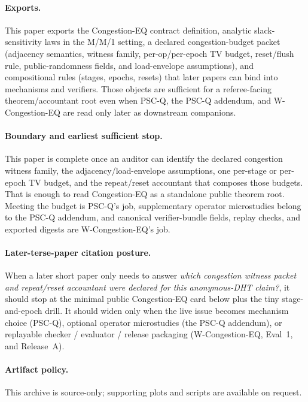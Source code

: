 \documentclass[11pt]{article}
\theoremstyle{definition}
\theoremstyle{remark}
\begin{document}
\paragraph{Exports.}
This paper exports the Congestion-EQ contract definition, analytic slack-sensitivity laws in the M/M/1 setting, a declared congestion-budget packet (adjacency semantics, witness family, per-op/per-epoch TV budget, reset/flush rule, public-randomness fields, and load-envelope assumptions), and compositional rules (stages, epochs, resets) that later papers can bind into mechanisms and verifiers. Those objects are sufficient for a referee-facing theorem/accountant root even when PSC-Q, the PSC-Q addendum, and W-Congestion-EQ are read only later as downstream companions.\cite{series:pscq,series:pscqaddendum,series:wcongeq}

\paragraph{Boundary and earliest sufficient stop.}
This paper is complete once an auditor can identify the declared congestion witness family, the adjacency/load-envelope assumptions, one per-stage or per-epoch TV budget, and the repeat/reset accountant that composes those budgets. That is enough to read Congestion-EQ as a standalone public theorem root. Meeting the budget is PSC-Q's job, supplementary operator microstudies belong to the PSC-Q addendum, and canonical verifier-bundle fields, replay checks, and exported digests are W-Congestion-EQ's job.\cite{series:pscq,series:pscqaddendum,series:wcongeq}

\paragraph{Later-terse-paper citation posture.}
When a later short paper only needs to answer \emph{which congestion witness packet and repeat/reset accountant were declared for this anonymous-DHT claim?}, it should stop at the minimal public Congestion-EQ card below plus the tiny stage-and-epoch drill.
It should widen only when the live issue becomes mechanism choice (PSC-Q), optional operator microstudies (the PSC-Q addendum), or replayable checker / evaluator / release packaging (W-Congestion-EQ, Eval~1, and Release~A).\cite{series:pscq,series:pscqaddendum,series:wcongeq,series:evalnotary,anondht_release_receipts}

\paragraph{Artifact policy.}
This archive is source-only; supporting plots and scripts are available on request.\cite{series:artifactpolicy}
\end{document}
